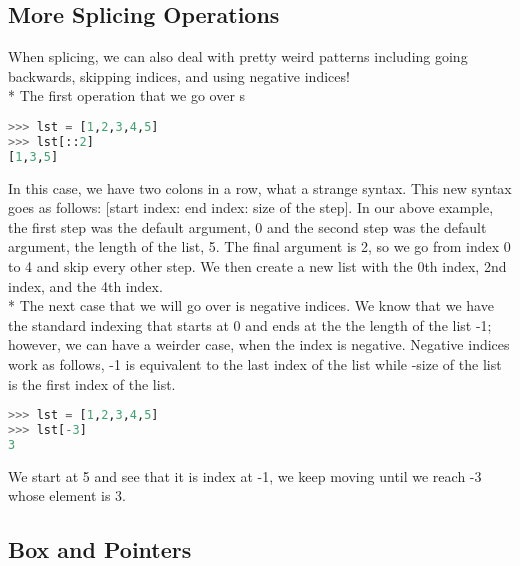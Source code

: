 \documentclass{article}
\begin{document}
 \subsection{More Splicing Operations} 
 When splicing, we can also deal with pretty weird patterns including going backwards, skipping indices, and using negative indices! \\*
 \bigskip
 The first operation that we go over s 
 \begin{lstlisting}[language = Python]
>>> lst = [1,2,3,4,5]
>>> lst[::2]
[1,3,5]
\end{lstlisting}
In this case, we have two colons in a row, what a strange syntax. This new syntax goes as follows: [start index: end index: size of the step]. In our above example, the first step was the default argument, 0 and the second step was the default argument, the  length of the list, 5. The final argument is 2, so we go from index 0 to 4 and skip every other step. We then create a new list with the 0th index, 2nd index, and the 4th index. \\*
\bigskip
The next case that we will go over is negative indices. We know that we have the standard indexing that starts at 0 and ends at the the length of the list -1; however, we can have a  weirder case, when the index is negative. Negative indices work as follows, -1 is equivalent to the last index of the list while -size of the list is the first index of the list. 
 \begin{lstlisting}[language = Python]
>>> lst = [1,2,3,4,5]
>>> lst[-3]
3
\end{lstlisting}
We start at 5 and see that it is index at -1, we keep moving until we reach -3 whose element is 3. 
\subsection{Box and Pointers}
\end{document}
